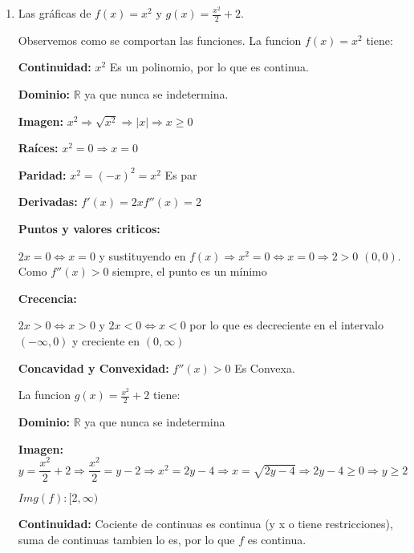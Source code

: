 \documentclass[12pt]{article}
\begin{document}
\begin{enumerate}[\hspace{9px} a)]
    \item Las gr\'aficas de \(f(x)=x^2\) y \(g(x)=\displaystyle\frac{x^2}{2}+2\).\bigskip
    
        Observemos como se comportan las funciones. 
        La funcion \(f(x)=x^2\) tiene:\medskip

        \textbf{Continuidad: }\(x^2\) Es un polinomio, por lo que es continua.\medskip

        \textbf{Dominio: }\(\mathbb{R}\) ya que nunca se indetermina.\medskip
        
        \textbf{Imagen: }\(x^2 \Rightarrow\sqrt{x^2}\Rightarrow|x|\Rightarrow x\geq 0\)\medskip

        \textbf{Ra\'ices: }\(x^2=0\Rightarrow x=0\)\medskip

        \textbf{Paridad: }\(x^2=(-x)^2=x^2\) Es par\medskip

        \textbf{Derivadas: }\(f'(x)=2x\)\qquad\(f''(x)=2\)  \medskip

        \textbf{Puntos y valores criticos: }\medskip
        
        \(2x=0 \Leftrightarrow x=0\) y sustituyendo en \(f(x) \Rightarrow x^2=0 \Leftrightarrow x=0\Rightarrow 2>0\) \((0,0)\). Como \(f''(x)>0\) siempre, el punto es un m\'inimo\medskip

        \textbf{Crecencia: }\medskip
        
        \(2x>0 \Leftrightarrow x>0\) y \(2x<0 \Leftrightarrow x<0\) por lo que es decreciente en el intervalo \((-\infty,0)\) y creciente en \((0,\infty)\)\medskip

        \textbf{Concavidad y Convexidad: }\quad\(f''(x)>0\) Es Convexa.\bigskip
        
        La funcion \(g(x)=\displaystyle\frac{x^2}{2}+2\) tiene:\medskip

        \textbf{Dominio: }\(\mathbb{R}\) ya que nunca se indetermina \medskip

        \textbf{Imagen: }
        \[y=\frac{x^2}{2}+2 \Rightarrow \frac{x^2}{2}=y-2 \Rightarrow x^2=2y-4 \Rightarrow x=\sqrt{2y-4} \Longrightarrow 2y-4\geq0 \Rightarrow y\geq2\]

        \(Img(f): [2,\infty)\)\medskip

        \textbf{Continuidad: } Cociente de continuas es continua (y x o tiene restricciones), suma de continuas tambien lo es, por lo que $f$ es continua.\medskip


\end{enumerate}
\end{document}
